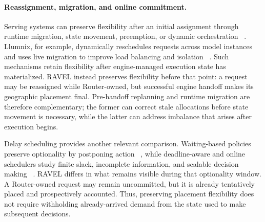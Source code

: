 \paragraph{Reassignment, migration, and online commitment.}
Serving systems can preserve flexibility after an initial assignment through
runtime migration, state movement, preemption, or dynamic orchestration
~\cite{llumnix,spotserve,serverlessllm,dejavu,dlora}.
Llumnix, for example, dynamically reschedules requests across model instances
and uses live migration to improve load balancing and isolation
~\cite{llumnix}.
Such mechanisms retain flexibility after engine-managed execution state has
materialized.
RAVEL instead preserves flexibility before that point:
a request may be reassigned while Router-owned, but successful engine handoff
makes its geographic placement final.
Pre-handoff replanning and runtime migration are therefore complementary;
the former can correct stale allocations before state movement is necessary,
while the latter can address imbalance that arises after execution begins.

Delay scheduling provides another relevant comparison.
Waiting-based policies preserve optionality by postponing action
~\cite{delayscheduling}, while deadline-aware and online schedulers study
finite slack, incomplete information, and scalable decision making
~\cite{liu_layland_edf,sparrow,flow_imprecise,omega,firmament}.
RAVEL differs in what remains visible during that optionality window.
A Router-owned request may remain uncommitted, but it is already tentatively
placed and prospectively accounted.
Thus, preserving placement flexibility does not require withholding
already-arrived demand from the state used to make subsequent decisions.
